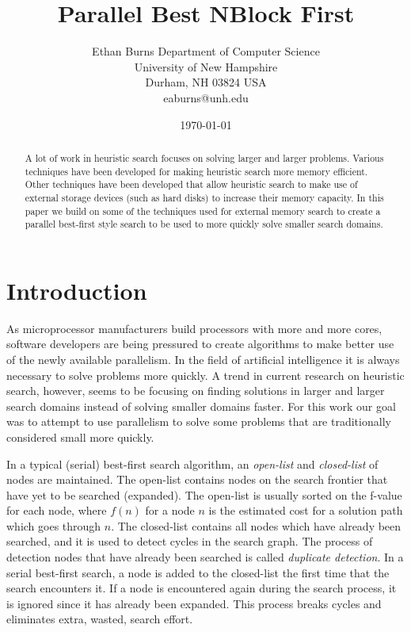 \documentclass{article}
\title{Parallel Best NBlock First}
\author{Ethan Burns
  Department of Computer Science \\
  University of New Hampshire \\
  Durham, NH 03824 USA \\
  eaburns@unh.edu}
\date{\today}
\begin{document}
\maketitle

\begin{abstract}
  A lot of work in heuristic search focuses on solving larger and larger
  problems.  Various techniques have been developed for making heuristic
  search more memory efficient.  Other techniques have been developed
  that allow heuristic search to make use of external storage devices
  (such as hard disks) to increase their memory capacity.  In this paper
  we build on some of the techniques used for external memory search to
  create a parallel best-first style search to be used to more quickly
  solve smaller search domains.
\end{abstract}

\section{Introduction}

As microprocessor manufacturers build processors with more and more
cores, software developers are being pressured to create algorithms to
make better use of the newly available parallelism.  In the field of
artificial intelligence it is always necessary to solve problems more
quickly.  A trend in current research on heuristic search, however,
seems to be focusing on finding solutions in larger and larger search
domains instead of solving smaller domains faster.  For this work our
goal was to attempt to use parallelism to solve some problems that are
traditionally considered small more quickly.

In a typical (serial) best-first search algorithm, an \emph{open-list}
and \emph{closed-list} of nodes are maintained.  The open-list
contains nodes on the search frontier that have yet to be searched
(expanded).  The open-list is usually sorted on the f-value for each
node, where $f(n)$ for a node $n$ is the estimated cost for a solution
path which goes through $n$.  The closed-list contains all nodes
which have already been searched, and it is used to detect cycles in
the search graph.  The process of detection nodes that have already
been searched is called \emph{duplicate detection}.  In a serial
best-first search, a node is added to the closed-list the first time
that the search encounters it.  If a node is encountered again during
the search process, it is ignored since it has already been expanded.
This process breaks cycles and eliminates extra, wasted, search
effort.
\end{document}
